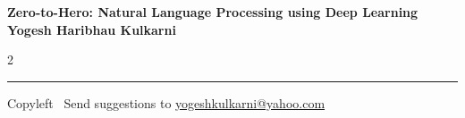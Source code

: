 \documentclass[8pt,landscape]{article}
\begin{document}
\footnotesize


\begin{center}
\Large{\textbf{Zero-to-Hero: Natural Language Processing using Deep Learning\\ Yogesh Haribhau Kulkarni}}  
\end{center}

\begin{multicols}{2}

\end{multicols}

\rule{\linewidth}{0.25pt}
\scriptsize
Copyleft \textcopyleft\  Send suggestions to 
\href{http://www.yogeshkulkarni.com}{yogeshkulkarni@yahoo.com}
\end{document}
